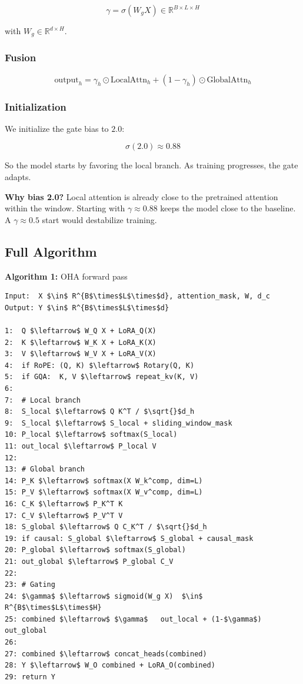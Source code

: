 \[
\gamma = \sigma(W_g X) \in \mathbb{R}^{B \times L \times H}
\]

with $W_g \in \mathbb{R}^{d \times H}$.

\subsubsection{Fusion}

\[
\text{output}_h = \gamma_h \odot \text{LocalAttn}_h + (1 - \gamma_h) \odot \text{GlobalAttn}_h
\]

\subsubsection{Initialization}

We initialize the gate bias to $2.0$:

\[
\sigma(2.0) \approx 0.88
\]

So the model starts by favoring the local branch. As training progresses, 
the gate adapts.

\textbf{Why bias 2.0?} Local attention is already close to the pretrained 
attention within the window. Starting with $\gamma \approx 0.88$ keeps 
the model close to the baseline. A $\gamma \approx 0.5$ start would 
destabilize training.

\subsection{Full Algorithm}

\textbf{Algorithm 1:} OHA forward pass
\begin{lstlisting}
Input:  X $\in$ R^{B$\times$L$\times$d}, attention_mask, W, d_c
Output: Y $\in$ R^{B$\times$L$\times$d}

1:  Q $\leftarrow$ W_Q X + LoRA_Q(X)
2:  K $\leftarrow$ W_K X + LoRA_K(X)
3:  V $\leftarrow$ W_V X + LoRA_V(X)
4:  if RoPE: (Q, K) $\leftarrow$ Rotary(Q, K)
5:  if GQA:  K, V $\leftarrow$ repeat_kv(K, V)
6:
7:  # Local branch
8:  S_local $\leftarrow$ Q K^T / $\sqrt{}$d_h
9:  S_local $\leftarrow$ S_local + sliding_window_mask
10: P_local $\leftarrow$ softmax(S_local)
11: out_local $\leftarrow$ P_local V
12:
13: # Global branch
14: P_K $\leftarrow$ softmax(X W_k^comp, dim=L)
15: P_V $\leftarrow$ softmax(X W_v^comp, dim=L)
16: C_K $\leftarrow$ P_K^T K
17: C_V $\leftarrow$ P_V^T V
18: S_global $\leftarrow$ Q C_K^T / $\sqrt{}$d_h
19: if causal: S_global $\leftarrow$ S_global + causal_mask
20: P_global $\leftarrow$ softmax(S_global)
21: out_global $\leftarrow$ P_global C_V
22:
23: # Gating
24: $\gamma$ $\leftarrow$ sigmoid(W_g X)  $\in$ R^{B$\times$L$\times$H}
25: combined $\leftarrow$ $\gamma$   out_local + (1-$\gamma$)   out_global
26:
27: combined $\leftarrow$ concat_heads(combined)
28: Y $\leftarrow$ W_O combined + LoRA_O(combined)
29: return Y
\end{lstlisting}

